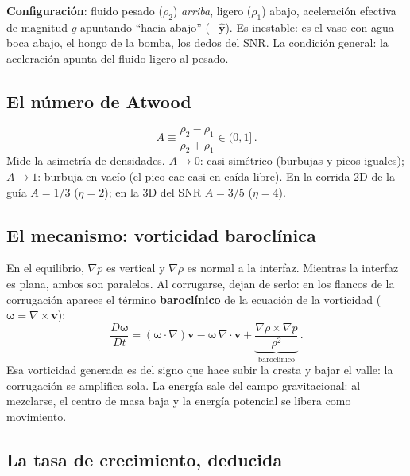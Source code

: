 \documentclass[11pt,a4paper]{article}
\newcommand{\vct}{\mathbf{v}}
\newcommand{\term}[1]{\textbf{#1}}
\begin{document}
\term{Configuración}: fluido pesado ($\rho_2$) \emph{arriba}, ligero ($\rho_1$) abajo,
aceleración efectiva de magnitud $g$ apuntando ``hacia abajo'' ($-\hat{\mathbf{y}}$).
Es inestable: es el vaso con agua boca abajo, el hongo de la bomba, los dedos del SNR.
La condición general: la aceleración apunta del fluido ligero al pesado.

\subsection{El número de Atwood}

\begin{equation}
A \equiv \frac{\rho_2-\rho_1}{\rho_2+\rho_1}\in(0,1]\,.
\end{equation}
Mide la asimetría de densidades. $A\to0$: casi simétrico (burbujas y picos iguales);
$A\to1$: burbuja en vacío (el pico cae casi en caída libre). En la corrida 2D de la guía
$A=1/3$ ($\eta=2$); en la 3D del SNR $A=3/5$ ($\eta=4$).

\subsection{El mecanismo: vorticidad baroclínica}

En el equilibrio, $\nabla p$ es vertical y $\nabla\rho$ es normal a la interfaz. Mientras
la interfaz es plana, ambos son paralelos. Al corrugarse, dejan de serlo: en los flancos de
la corrugación aparece el término \term{baroclínico} de la ecuación de la vorticidad
($\boldsymbol{\omega}=\nabla\times\vct$):
\begin{equation}
\frac{D\boldsymbol{\omega}}{Dt}
= (\boldsymbol{\omega}\cdot\nabla)\vct
-\boldsymbol{\omega}\,\nabla\cdot\vct
+ \underbrace{\frac{\nabla\rho\times\nabla p}{\rho^2}}_{\text{baroclínico}}\,.
\end{equation}
Esa vorticidad generada es del signo que hace subir la cresta y bajar el valle: la
corrugación se amplifica sola. La energía sale del campo gravitacional: al mezclarse, el
centro de masa baja y la energía potencial se libera como movimiento.

\subsection{La tasa de crecimiento, deducida}
\end{document}
